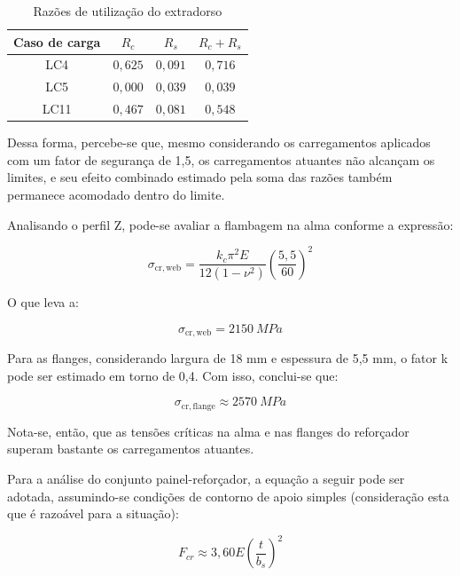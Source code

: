 \begin{table}[H]
    \centering
    \caption{Razões de utilização do extradorso}
    \label{tab:razoes_utilizacao_extradorso}
    \begin{tabular}{|c|c|c|c|}
        \hline
        \textbf{Caso de carga} &
        \textbf{$R_c$} &
        \textbf{$R_s$} &
        \textbf{$R_c+R_s$} \\
        \hline
        LC4  & $0{,}625$ & $0{,}091$ & $0{,}716$ \\
        \hline
        LC5  & $0{,}000$ & $0{,}039$ & $0{,}039$ \\
        \hline
        LC11 & $0{,}467$ & $0{,}081$ & $0{,}548$ \\
        \hline
    \end{tabular}
\end{table}


Dessa forma, percebe-se que, mesmo considerando os carregamentos aplicados com um  fator de segurança de 1,5, os carregamentos atuantes não alcançam os limites, e seu efeito combinado estimado pela soma das razões também permanece acomodado dentro do limite.

Analisando o perfil Z, pode-se avaliar a flambagem na alma conforme a expressão:


\begin{equation}
    \sigma_{\mathrm{cr,web}} =
\frac{k_c \pi^2 E}{12(1-\nu^2)}
\left(\frac{5,5}{60}\right)^2
\end{equation}

O que leva a:

\begin{equation}
    \sigma_{\mathrm{cr,web}} =
2150\  MPa
\end{equation}


Para as flanges, considerando largura de 18 mm e espessura de 5,5 mm, o fator k pode ser estimado em torno de 0,4. Com isso, conclui-se que:

\begin{equation}
    \sigma_{\mathrm{cr,flange}} \approx
2570\  MPa
\end{equation}

Nota-se, então, que as tensões críticas na alma e nas flanges do reforçador superam bastante os carregamentos atuantes.

Para a análise do conjunto painel-reforçador, a equação a seguir pode ser adotada, assumindo-se condições de contorno de apoio simples (consideração esta que é razoável para a situação):

\begin{equation}
    F_{cr}\approx 3,60E\left(\frac{t}{b_s}\right)^2
\end{equation}

